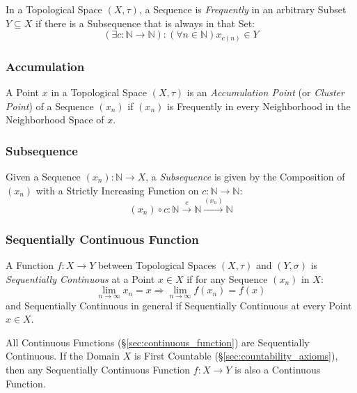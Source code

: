 In a Topological Space $(X, \tau)$, a Sequence is \emph{Frequently}
in an arbitrary Subset $Y \subseteq X$ if there is a Subsequence that
is always in that Set:
\[
  (\exists c : \mathbb{N} \rightarrow \mathbb{N})
  : (\forall n \in \mathbb{N}) x_{c(n)} \in Y
\]



\subsubsection{Accumulation}\label{sec:accumulation}

A Point $x$ in a Topological Space $(X, \tau)$ is an
\emph{Accumulation Point} (or \emph{Cluster Point}) of a Sequence
$(x_n)$ if $(x_n)$ is Frequently in every Neighborhood in the
Neighborhood Space of $x$.



\subsubsection{Subsequence}\label{sec:subsequence_topology}

Given a Sequence $(x_n) : \mathbb{N} \rightarrow X$, a
\emph{Subsequence} is given by the Composition of $(x_n)$ with a
Strictly Increasing Function on $c : \mathbb{N} \rightarrow
\mathbb{N}$:
\[
  (x_n) \circ c :
  \mathbb{N} \xrightarrow{c} \mathbb{N} \xrightarrow{(x_n)} \mathbb{N}
\]



\subsubsection{Sequentially Continuous Function}
\label{sec:sequentially_continuous}

A Function $f : X \rightarrow Y$ between Topological Spaces $(X,
\tau)$ and $(Y, \sigma)$ is \emph{Sequentially Continuous} at a Point
$x \in X$ if for any Sequence $(x_n)$ in $X$:
\[
  \lim_{n \rightarrow \infty} x_n = x
  \Rightarrow \lim_{n \rightarrow \infty} f(x_n) = f(x)
\]
and Sequentially Continuous in general if Sequentially Continuous at
every Point $x \in X$.

All Continuous Functions (\S\ref{sec:continuous_function}) are
Sequentially Continuous. If the Domain $X$ is First Countable
(\S\ref{sec:countability_axioms}), then any Sequentially Continuous
Function $f : X \rightarrow Y$ is also a Continuous Function.



